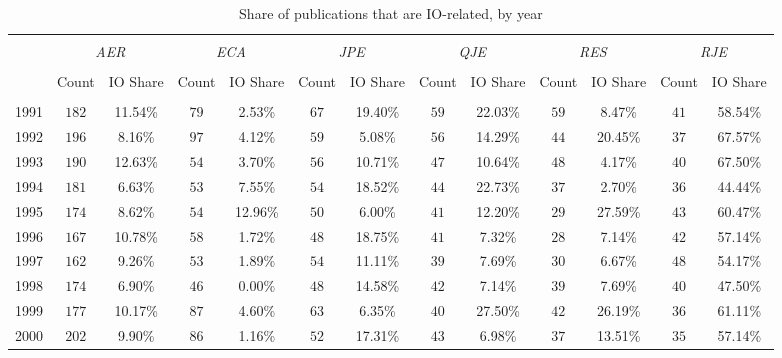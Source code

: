 
\begin{table}[!htbp] \centering 
  \caption{Share of publications that are IO-related, by year} 
  \label{} 
\begin{adjustbox}{max width = \textwidth}
\footnotesize 
\begin{tabular}{@{\extracolsep{2pt}} ccccccccccccc} 
\\[-1.8ex]\hline 
\hline \\[-1.8ex] & \multicolumn{2}{c}{\textit{AER}}& \multicolumn{2}{c}{\textit{ECA}}& \multicolumn{2}{c}{\textit{JPE}}& \multicolumn{2}{c}{\textit{QJE}}& \multicolumn{2}{c}{\textit{RES}}& \multicolumn{2}{c}{\textit{RJE}}\\ 
\cline{2-3}\cline{4-5}\cline{6-7}\cline{8-9}\cline{10-11}\cline{12-13}\\ 
 & Count & IO Share & Count & IO Share & Count & IO Share & Count & IO Share & Count & IO Share & Count & IO Share \\ 
\hline \\[-1.8ex] 
1991 & $182$ & 11.54\% & $79$ & 2.53\% & $67$ & 19.40\% & $59$ & 22.03\% & $59$ & 8.47\% & $41$ & 58.54\% \\ 
1992 & $196$ & 8.16\% & $97$ & 4.12\% & $59$ & 5.08\% & $56$ & 14.29\% & $44$ & 20.45\% & $37$ & 67.57\% \\ 
1993 & $190$ & 12.63\% & $54$ & 3.70\% & $56$ & 10.71\% & $47$ & 10.64\% & $48$ & 4.17\% & $40$ & 67.50\% \\ 
1994 & $181$ & 6.63\% & $53$ & 7.55\% & $54$ & 18.52\% & $44$ & 22.73\% & $37$ & 2.70\% & $36$ & 44.44\% \\ 
1995 & $174$ & 8.62\% & $54$ & 12.96\% & $50$ & 6.00\% & $41$ & 12.20\% & $29$ & 27.59\% & $43$ & 60.47\% \\ 
1996 & $167$ & 10.78\% & $58$ & 1.72\% & $48$ & 18.75\% & $41$ & 7.32\% & $28$ & 7.14\% & $42$ & 57.14\% \\ 
1997 & $162$ & 9.26\% & $53$ & 1.89\% & $54$ & 11.11\% & $39$ & 7.69\% & $30$ & 6.67\% & $48$ & 54.17\% \\ 
1998 & $174$ & 6.90\% & $46$ & 0.00\% & $48$ & 14.58\% & $42$ & 7.14\% & $39$ & 7.69\% & $40$ & 47.50\% \\ 
1999 & $177$ & 10.17\% & $87$ & 4.60\% & $63$ & 6.35\% & $40$ & 27.50\% & $42$ & 26.19\% & $36$ & 61.11\% \\ 
2000 & $202$ & 9.90\% & $86$ & 1.16\% & $52$ & 17.31\% & $43$ & 6.98\% & $37$ & 13.51\% & $35$ & 57.14\% \\ 

\end{tabular}
\end{adjustbox}
\end{table}
